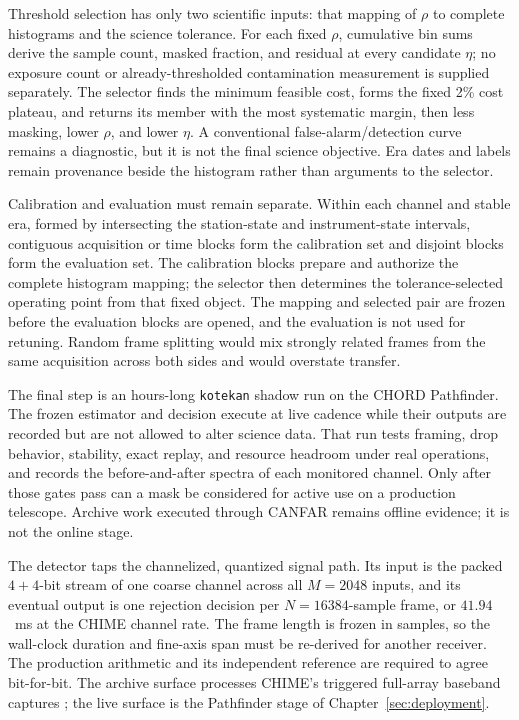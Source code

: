 Threshold selection has only two scientific inputs: that mapping of $\rho$ to complete histograms and the science tolerance. For each fixed $\rho$, cumulative bin sums derive the sample count, masked fraction, and residual at every candidate $\eta$; no exposure count or already-thresholded contamination measurement is supplied separately. The selector finds the minimum feasible cost, forms the fixed 2\% cost plateau, and returns its member with the most systematic margin, then less masking, lower $\rho$, and lower $\eta$. A conventional false-alarm/detection curve remains a diagnostic, but it is not the final science objective. Era dates and labels remain provenance beside the histogram rather than arguments to the selector.

Calibration and evaluation must remain separate. Within each channel and stable era, formed by intersecting the station-state and instrument-state intervals, contiguous acquisition or time blocks form the calibration set and disjoint blocks form the evaluation set. The calibration blocks prepare and authorize the complete histogram mapping; the selector then determines the tolerance-selected operating point from that fixed object. The mapping and selected pair are frozen before the evaluation blocks are opened, and the evaluation is not used for retuning. Random frame splitting would mix strongly related frames from the same acquisition across both sides and would overstate transfer.

The final step is an hours-long \texttt{kotekan} shadow run on the CHORD Pathfinder. The frozen estimator and decision execute at live cadence while their outputs are recorded but are not allowed to alter science data. That run tests framing, drop behavior, stability, exact replay, and resource headroom under real operations, and records the before-and-after spectra of each monitored channel. Only after those gates pass can a mask be considered for active use on a production telescope. Archive work executed through CANFAR remains offline evidence; it is not the online stage.

The detector taps the channelized, quantized signal path. Its input is the packed $4{+}4$-bit stream of one coarse channel across all $M=2048$ inputs, and its eventual output is one rejection decision per $N=16384$-sample frame, or $41.94$~ms at the CHIME channel rate. The frame length is frozen in samples, so the wall-clock duration and fine-axis span must be re-derived for another receiver. The production arithmetic and its independent reference are required to agree bit-for-bit. The archive surface processes CHIME's triggered full-array baseband captures \cite{amiri2018frb}; the live surface is the Pathfinder stage of Chapter~\ref{sec:deployment}.

